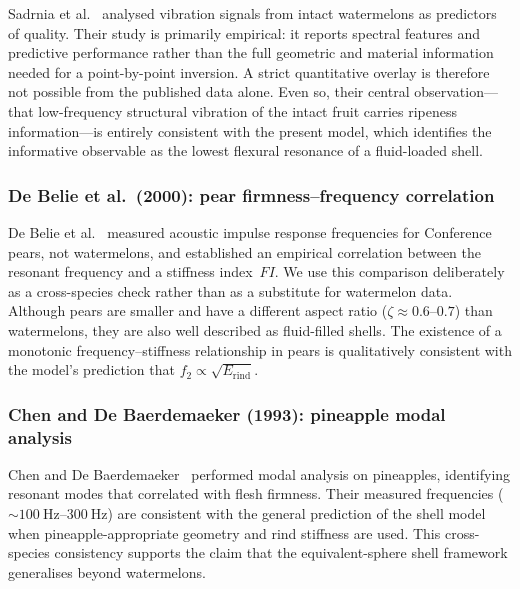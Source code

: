 Sadrnia et al.~\cite{Sadrnia2008Vibration} analysed vibration signals
from intact watermelons as predictors of quality.  Their study is
primarily empirical: it reports spectral features and predictive
performance rather than the full geometric and material information
needed for a point-by-point inversion.  A strict quantitative overlay is
therefore not possible from the published data alone.  Even so, their
central observation---that low-frequency structural vibration of the
intact fruit carries ripeness information---is entirely consistent with
the present model, which identifies the informative observable as the
lowest flexural resonance of a fluid-loaded shell.

\subsubsection{De Belie et al.\ (2000): pear firmness--frequency correlation}

De Belie et al.~\cite{DeBelieetal2000} measured acoustic impulse
response frequencies for Conference pears, not watermelons, and
established an empirical correlation between the resonant frequency and
a stiffness index~$FI$.  We use this comparison deliberately as a
cross-species check rather than as a substitute for watermelon data.
Although pears are smaller and have a different aspect ratio ($\zeta
\approx 0.6$--$0.7$) than watermelons, they are also well described as
fluid-filled shells.  The existence of a monotonic frequency--stiffness
relationship in pears is qualitatively consistent with the model's
prediction that $f_2 \propto \sqrt{E_{\mathrm{rind}}}$.

\subsubsection{Chen and De Baerdemaeker (1993): pineapple modal analysis}

Chen and De Baerdemaeker~\cite{ChenDeBaerdemaeker1993} performed modal
analysis on pineapples, identifying resonant modes that correlated with
flesh firmness.  Their measured frequencies
($\sim\SIrange{100}{300}{\hertz}$) are consistent with the general
prediction of the shell model when pineapple-appropriate geometry and
rind stiffness are used.  This cross-species consistency supports the
claim that the equivalent-sphere shell framework generalises beyond
watermelons.

